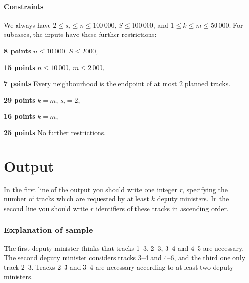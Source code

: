 \paragraph*{Constraints}
We always have $2 \leq s_i \leq n \leq 100\,000$, $S \leq 100\,000$, and $1 \leq k \leq m \leq 50\,000$. For subcases, the inputs have these further restrictions:

\begin{description}
    \item{\textbf{8 points}} $n \leq 10\,000$, $S \leq 2000$,
    \item{\textbf{15 points}} $n \leq 10\,000$, $m \leq 2\,000$,
    \item{\textbf{7 points}} Every neighbourhood is the endpoint of at most $2$ planned tracks.
    \item{\textbf{29 points}} $k = m$, $s_i = 2$,
    \item{\textbf{16 points}} $k = m$, 
    \item{\textbf{25 points}} No further restrictions.
\end{description}


\section*{Output}
In the first line of the output you should write one integer $r$, specifying the number of tracks which are requested by at least $k$ deputy ministers. In the second line you should write $r$ identifiers of these tracks in ascending order.

\subsubsection*{Explanation of sample}

\noindent
The first deputy minister thinks that tracks 1–3, 2–3, 3–4 and 4–5 are necessary. The second deputy minister considers tracks 3–4 and 4–6, and the third one only track 2–3. Tracks
2–3 and 3–4 are necessary according to at least two deputy ministers.
